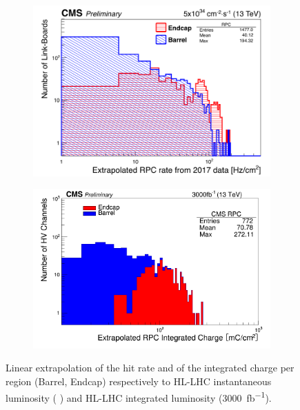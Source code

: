 \begingroup\setlength{\intextsep}{0pt}\setlength{\columnsep}{15pt}
	
	\begin{figure}
		\begin{subfigure}{\linewidth}
			\centering
			\includegraphics[width=\linewidth]{fig/chapt5/RPC-Rate-HL-LHC_2017.png}
			\caption{\label{fig:RPC-HL-LHC:A}}
		\end{subfigure}
		\begin{subfigure}{\linewidth}
			\centering
			\includegraphics[width=\linewidth]{fig/chapt5/RPC-IC-HL-LHC_2016.png}
			\caption{\label{fig:RPC-HL-LHC:B}}
		\end{subfigure}
		\caption{\label{fig:RPC-HL-LHC} Linear extrapolation of the hit rate  and of the integrated charge  per region (Barrel, Endcap) respectively to HL-LHC instantaneous luminosity ( \siflux) and HL-LHC integrated luminosity (\SI{3000}{fb^{-1}}).}
	\end{figure}

